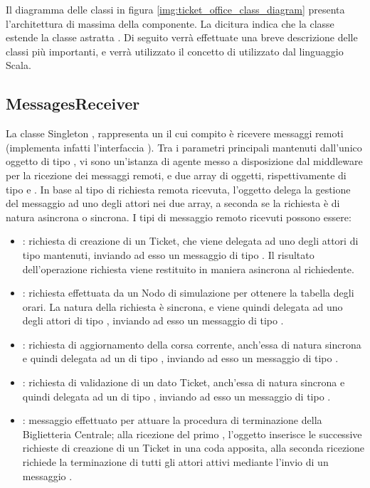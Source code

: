 	Il diagramma delle classi in figura \ref{img:ticket_office_class_diagram} presenta l'architettura di massima della componente. La dicitura  indica che la classe estende la classe astratta . Di seguito verrà effettuate una breve descrizione delle classi più importanti, e verrà utilizzato il concetto di  utilizzato dal linguaggio Scala.
	
	\subsection{MessagesReceiver}
	
	La classe Singleton , rappresenta un  il cui compito è ricevere messaggi remoti (implementa infatti l'interfaccia ). Tra i parametri principali mantenuti dall'unico oggetto di tipo , vi sono un'istanza di agente messo a disposizione dal middleware  per la ricezione dei messaggi remoti, e due array di oggetti, rispettivamente di tipo  e . 
	In base al tipo di richiesta remota ricevuta, l'oggetto  delega la gestione del messaggio ad uno degli attori nei due array, a seconda se la richiesta è di natura asincrona o sincrona. I tipi di messaggio remoto ricevuti possono essere:
	\begin{itemize}
		\item {}: richiesta di creazione di un Ticket, che viene delegata ad uno degli attori di tipo  mantenuti, inviando ad esso un messaggio di tipo . Il risultato dell'operazione richiesta viene restituito in maniera asincrona al richiedente.
		\item {}: richiesta effettuata da un Nodo di simulazione per ottenere la tabella degli orari. La natura della richiesta è sincrona, e viene quindi delegata ad uno degli attori di tipo , inviando ad esso un messaggio di tipo .
		
		\item {}: richiesta di aggiornamento della corsa corrente, anch'essa di natura sincrona e quindi delegata ad un  di tipo , inviando ad esso un messaggio di tipo .
		
		\item {}: richiesta di validazione di un dato Ticket, anch'essa di natura sincrona e quindi delegata ad un   di tipo , inviando ad esso un messaggio di tipo .
		
		\item {}: messaggio effettuato per attuare la procedura di terminazione della Biglietteria Centrale; alla ricezione del primo , l'oggetto  inserisce le successive richieste di creazione di un Ticket in una coda apposita, alla seconda ricezione richiede la terminazione di tutti gli attori attivi mediante l'invio di un messaggio .		
		
	\end{itemize}
	
